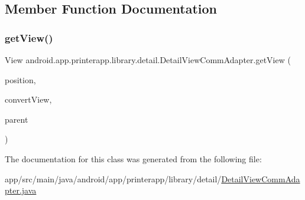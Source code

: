 \subsection{Member Function Documentation}
\mbox{\label{classandroid_1_1app_1_1printerapp_1_1library_1_1detail_1_1_detail_view_comm_adapter_ac1085a3be76291aba18401a13dddebf8}} 
\subsubsection{\texorpdfstring{get\+View()}{getView()}}
{\footnotesize\ttfamily View android.\+app.\+printerapp.\+library.\+detail.\+Detail\+View\+Comm\+Adapter.\+get\+View (\begin{DoxyParamCaption}\item[{int}]{position,  }\item[{View}]{convert\+View,  }\item[{View\+Group}]{parent }\end{DoxyParamCaption})}



The documentation for this class was generated from the following file\+:\begin{DoxyCompactItemize}
\item 
app/src/main/java/android/app/printerapp/library/detail/\hyperlink{_detail_view_comm_adapter_8java}{Detail\+View\+Comm\+Adapter.\+java}\end{DoxyCompactItemize}
